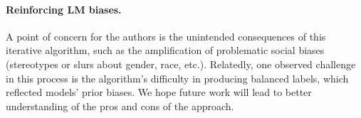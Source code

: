 \paragraph{Reinforcing LM biases.} A point of concern for the authors is the unintended consequences of this iterative algorithm, such as the amplification of problematic social biases (stereotypes or slurs about gender, race, etc.). Relatedly, one observed challenge in this process is the algorithm's difficulty in producing balanced labels, which reflected models' prior biases. We hope future work will lead to better understanding of the pros and cons of the approach. 


